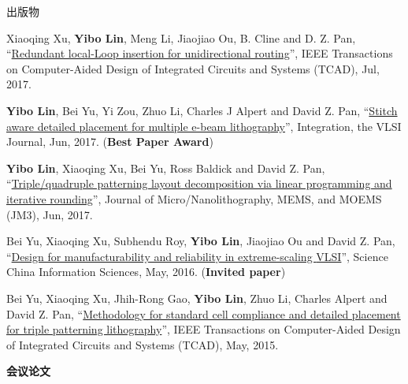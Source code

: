 \begin{rSection}{出版物}
\begin{description}[font=\normalfont, rightmargin=2em]
{}
            

\item[{[J5]}]{
        Xiaoqing Xu, \textbf{Yibo Lin}, Meng Li, Jiaojiao Ou,  B. Cline  and  D. Z. Pan, 
    ``\href{http://dx.doi.org/10.1109/TCAD.2017.2651811}{Redundant local-Loop insertion for unidirectional routing}'', 
    IEEE Transactions on Computer-Aided Design of Integrated Circuits and Systems (TCAD), Jul, 2017.
    
}
            

\item[{[J4]}]{
        \textbf{Yibo Lin}, Bei Yu, Yi Zou, Zhuo Li, Charles J Alpert and David Z. Pan, 
    ``\href{http://dx.doi.org/10.1016/j.vlsi.2017.02.004}{Stitch aware detailed placement for multiple e-beam lithography}'', 
    Integration, the VLSI Journal, Jun, 2017.
    (\textbf{Best Paper Award})
}
            

\item[{[J3]}]{
        \textbf{Yibo Lin}, Xiaoqing Xu, Bei Yu, Ross Baldick and David Z. Pan, 
    ``\href{http://dx.doi.org/10.1117/1.JMM.16.2.023507}{Triple/quadruple patterning layout decomposition via linear programming and iterative rounding}'', 
    Journal of Micro/Nanolithography, MEMS, and MOEMS (JM3), Jun, 2017.
    
}
            

\item[{[J2]}]{
        Bei Yu, Xiaoqing Xu, Subhendu Roy, \textbf{Yibo Lin}, Jiaojiao Ou and David Z. Pan, 
    ``\href{http://link.springer.com/article/10.1007%2Fs11432-016-5560-6}{Design for manufacturability and reliability in extreme-scaling {VLSI}}'', 
    Science China Information Sciences, May, 2016.
    (\textbf{Invited paper})
}
            

\item[{[J1]}]{
        Bei Yu, Xiaoqing Xu, Jhih-Rong Gao, \textbf{Yibo Lin}, Zhuo Li, Charles Alpert and David Z. Pan, 
    ``\href{https://doi.org/10.1109/TCAD.2015.2401571}{Methodology for standard cell compliance and detailed placement for triple patterning lithography}'', 
    IEEE Transactions on Computer-Aided Design of Integrated Circuits and Systems (TCAD), May, 2015.
    
}
            

\end{description}
    

\textbf{会议论文}
        

\begin{description}[font=\normalfont, rightmargin=2em]
    


\end{description}
\end{rSection}
